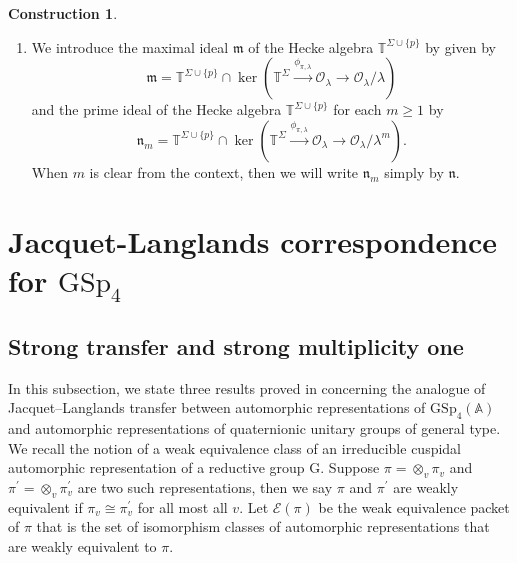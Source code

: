\documentclass[10pt]{amsart}
\numberwithin{equation}{section}
\theoremstyle{definition}
\newtheorem{construction}[equation]{Construction}
\def\GSp{\mathrm{GSp}}
\def\calE{\mathcal{E}}
\def\calO{\mathcal{O}}
\def\fracm{\mathfrak{m}}
\def\fracn{\mathfrak{n}}
\def\TT{\mathbb{T}}
\def\rmG{\mathrm{G}}
\begin{document}
\begin{construction}
\begin{enumerate}
\item We introduce the maximal ideal $\fracm$ of  the Hecke algebra $\TT^{\Sigma\cup\{p\}}$ by 
given by
\begin{equation*}
\fracm=\TT^{\Sigma\cup\{p\}}\cap \ker(\TT^{\Sigma}\xrightarrow{\phi_{\pi,\lambda}}\calO_{\lambda}\rightarrow\calO_{\lambda}/\lambda)
\end{equation*}
and the prime ideal of the Hecke algebra $\TT^{\Sigma\cup\{p\}}$ for each $m\geq 1$ by
\begin{equation*}
\fracn_{m}=\TT^{\Sigma\cup\{p\}}\cap \ker(\TT^{\Sigma}\xrightarrow{\phi_{\pi,\lambda}}\calO_{\lambda}\rightarrow\calO_{\lambda}/\lambda^{m}).
\end{equation*}
When $m$ is clear from the context, then we will write $\fracn_{m}$ simply by $\fracn$.
\end{enumerate}
\end{construction}

\section{Jacquet-Langlands correspondence for $\GSp_{4}$}
\subsection{Strong transfer and strong multiplicity one}
In this subsection, we state three results proved in \cite[\S10, \S11]{RW} concerning the analogue of Jacquet--Langlands transfer between automorphic representations of $\GSp_{4}(\mathbb{A})$ and automorphic representations of quaternionic unitary groups of general type. We recall the notion of a weak equivalence class of an irreducible cuspidal automorphic representation of a reductive group $\rmG$. Suppose  $\pi=\otimes_{v}\pi_{v}$ and $\pi^{\prime}=\otimes_{v}\pi^{\prime}_{v}$ are two such representations, then we say $\pi$ and $\pi^{\prime}$ are weakly equivalent if $\pi_{v}\cong \pi^{\prime}_{v}$ for all most all $v$. Let $\calE(\pi)$ be the weak equivalence packet of $\pi$ that is the set of isomorphism classes of automorphic representations that are weakly equivalent to $\pi$.
\end{document}
